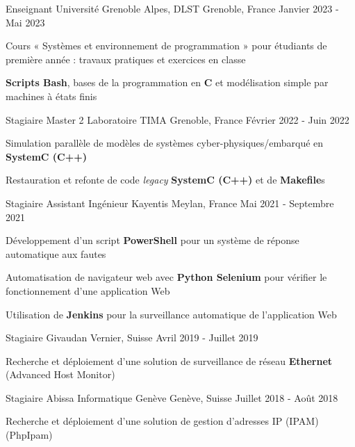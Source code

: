 \begin{cventries}
	\cventry
	{Enseignant} %
	{Université Grenoble Alpes, DLST} %
	{Grenoble, France} %
	{Janvier 2023 - Mai 2023} %
	{
		\begin{cvitems} %
		\item{Cours « Systèmes et environnement de programmation » pour étudiants de première année : travaux pratiques et exercices en classe}
		\item{\textbf{Scripts Bash}, bases de la programmation en \textbf{C} et modélisation simple par machines à états finis}
		\end{cvitems}
	}

	\cventry
	{Stagiaire Master 2} %
	{Laboratoire TIMA} %
	{Grenoble, France} %
	{Février 2022 - Juin 2022} %
	{
		\begin{cvitems} %
		\item{Simulation parallèle de modèles de systèmes cyber-physiques/embarqué en \textbf{SystemC (C++)}}
		\item{Restauration et refonte de code \emph{legacy} \textbf{SystemC (C++)} et de \textbf{Makefile}s	}		
		\end{cvitems}
	}

	\cventry
	{Stagiaire Assistant Ingénieur} %
	{Kayentis} %
	{Meylan, France} %
	{Mai 2021 - Septembre 2021} %
	{
		\begin{cvitems} %
		\item{Développement d'un script \textbf{PowerShell} pour un système de réponse automatique aux fautes}
		\item{Automatisation de navigateur web avec \textbf{Python Selenium} pour vérifier le fonctionnement d'une application Web}
		\item{Utilisation de \textbf{Jenkins} pour la surveillance automatique de l'application Web}
		\end{cvitems}
	}

	\cventry
	{Stagiaire} %
	{Givaudan} %
	{Vernier, Suisse} %
	{Avril 2019 - Juillet 2019} %
	{
		\begin{cvitems} %
		\item{Recherche et déploiement d'une solution de surveillance de réseau \textbf{Ethernet} (Advanced Host Monitor)}
		\end{cvitems}
	}

	\cventry
	{Stagiaire} %
	{Abissa Informatique Genève} %
	{Genève, Suisse} %
	{Juillet 2018 - Août 2018} %
	{
		\begin{cvitems} %
		\item{Recherche et déploiement d'une solution de gestion d'adresses IP (IPAM) (PhpIpam)}
		\end{cvitems}
	}
\end{cventries}
